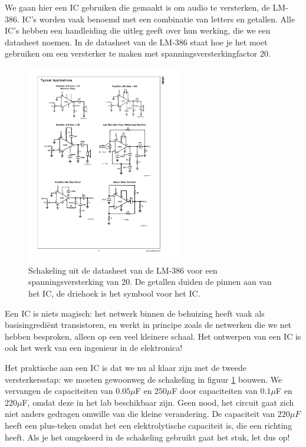 \documentclass{article}
\begin{document}
			We gaan hier een IC gebruiken die gemaakt is om audio te versterken, de LM-386. IC's worden vaak benoemd met een combinatie van letters en getallen. Alle IC's hebben een handleiding die uitleg geeft over hun werking, die we een datasheet noemen. In de datasheet van de LM-386 staat hoe je het moet gebruiken om een versterker te maken met spanningsversterkingfactor $20$.

			\begin{figure}[htbp]
				\centering
				\includegraphics[width=0.6\textwidth]{IC_versterker}
				\caption{Schakeling uit de datasheet van de LM-386 voor een spanningsversterking van 20. De getallen duiden de pinnen aan van het IC, de driehoek is het symbool voor het IC. }
				\label{fig:IC_versterker}
			\end{figure}

			Een IC is niets magisch: het netwerk binnen de behuizing heeft vaak als basisingredi\"ent transistoren, en werkt in principe zoals de netwerken die we net hebben besproken, alleen op een veel kleinere schaal. Het ontwerpen van een IC is ook het werk van een ingenieur in de elektronica!

			Het praktische aan een IC is dat we nu al klaar zijn met de tweede versterkersstap: we moeten gewoonweg de schakeling in figuur \ref{fig:IC_versterker} bouwen. We vervangen de capaciteiten van $0.05 \mu$F en $250\mu$F door capaciteiten van $0.1\mu$F en $220\mu$F, omdat deze in het lab beschikbaar zijn. Geen nood,  het circuit gaat zich niet anders gedragen omwille van die kleine verandering. De capaciteit van $220\mu F$ heeft een plus-teken omdat het een elektrolytische capaciteit is, die een richting heeft. Als je het omgekeerd in de schakeling gebruikt gaat het stuk, let dus op!
\end{document}

